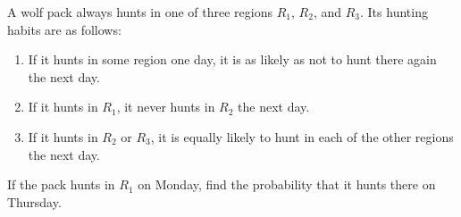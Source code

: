 \documentclass{ximera}
\begin{document}
\begin{example}\label{007301}
A wolf pack always hunts in one of three regions $R_{1}$, $R_{2}$, and $R_{3}$. Its hunting habits are as follows:

\begin{enumerate}
\item If it hunts in some region one day, it is as likely as not to hunt there again the next day.

\item If it hunts in $R_{1}$, it never hunts in $R_{2}$ the next day.

\item If it hunts in $R_{2}$ or $R_{3}$, it is equally likely to hunt in each of the other regions the next day.

\end{enumerate}

If the pack hunts in $R_{1}$ on Monday, find the probability that it hunts there on Thursday.



\end{example}
\end{document}
